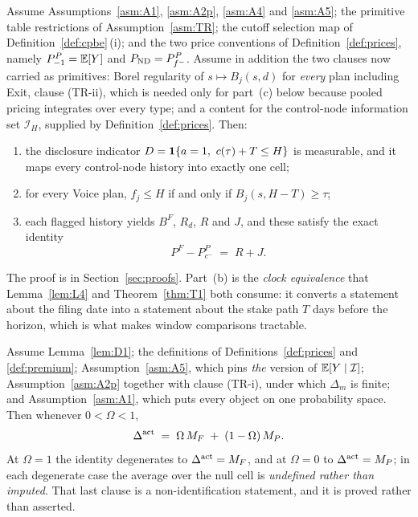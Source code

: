 \begin{lemma}
\label{lem:D1}
Assume Assumptions~\ref{asm:A1}, \ref{asm:A2p}, \ref{asm:A4} and \ref{asm:A5}; the primitive table
restrictions of Assumption~\ref{asm:TR}; the cutoff selection map of Definition~\ref{def:cpbe}\,(i); and the two price
conventions of Definition~\ref{def:prices}, namely $P_{-1}^P = \mathbb{E}[Y]$ and
$P_{\mathrm{ND}} = P_{f^-}^P$. Assume in addition the two clauses now carried as primitives: Borel
regularity of $s \mapsto B_j(s,d)$ for \emph{every} plan including Exit, clause (TR-ii), which is
needed only for part~(c) below because pooled pricing integrates over every type; and a content for
the control-node information set $\mathcal I_H$, supplied by Definition~\ref{def:prices}. Then:
\begin{enumerate}[label=(\alph*),leftmargin=2.4em,itemsep=3pt]
\item the disclosure indicator $D = \mathbf{1}\{a = 1,\ c(\tau) + T \le H\}$ is measurable, and it maps
  every control-node history into exactly one cell;
\item for every Voice plan, $f_j \le H$ if and only if $B_j(s, H-T) \ge \tau$;
\item each flagged history yields $B^F$, $R_d$, $R$ and $J$, and these satisfy the exact identity
  \begin{equation}
  \label{eq:runup-jump}
  P^F - P_{c^-}^P \;=\; R + J.
  \end{equation}
\end{enumerate}
\end{lemma}

The proof is in Section~\ref{sec:proofs}. Part~(b) is the \emph{clock equivalence} that
Lemma~\ref{lem:L4} and Theorem~\ref{thm:T1} both consume: it converts a statement about the filing
date into a statement about the stake path $T$ days before the horizon, which is what makes window
comparisons tractable.

\begin{lemma}
\label{lem:L1}
Assume Lemma~\ref{lem:D1}; the definitions of Definitions~\ref{def:prices} and \ref{def:premium};
Assumption~\ref{asm:A5}, which pins \emph{the} version of $\mathbb{E}[Y \mid \mathcal I]$;
Assumption~\ref{asm:A2p} together with clause (TR-i), under which $\Delta_m$ is finite; and
Assumption~\ref{asm:A1}, which puts every object on one probability space. Then whenever
$0 < \Omega < 1$,
\begin{equation}
\label{eq:L1}
\Delta^{\mathrm{act}} \;=\; \Omega\,M_F \;+\; (1-\Omega)\,M_P .
\end{equation}
At $\Omega = 1$ the identity degenerates to $\Delta^{\mathrm{act}} = M_F$, and at $\Omega = 0$ to $\Delta^{\mathrm{act}} = M_P$; in
each degenerate case the average over the null cell is \emph{undefined rather than imputed}. That
last clause is a non-identification statement, and it is proved rather than asserted.
\end{lemma}


